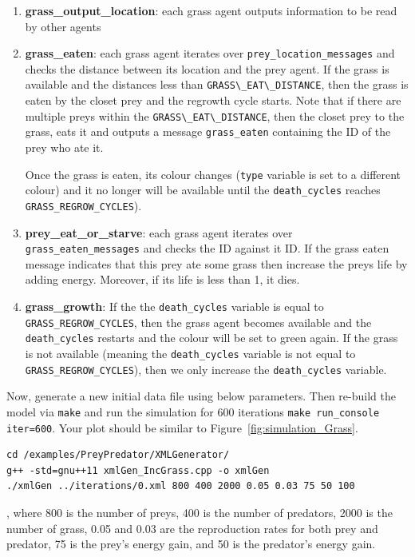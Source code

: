 \begin{enumerate}[{3.1}]
\item \textbf{grass\_output\_location}: each grass agent outputs information to be read by other agents
\item \textbf{grass\_eaten}: each grass agent iterates over \verb|prey_location_messages| and checks the distance between its location and the prey agent. If the grass is available and the distances less than \verb|GRASS\_EAT\_DISTANCE|, then the grass is eaten by the closet prey and the regrowth cycle starts. Note that if there are multiple preys within the \verb|GRASS\_EAT\_DISTANCE|, then the closet prey to the grass, eats it and outputs a message \verb|grass_eaten| containing the ID of the prey who ate it.

Once the grass is eaten, its colour changes (\verb|type| variable is set to a different colour) and it no longer will be available until the \verb|death_cycles| reaches \verb|GRASS_REGROW_CYCLES|). 
\item \textbf{prey\_eat\_or\_starve}: each grass agent iterates over \verb|grass_eaten_messages| and checks the ID against it ID. If the grass eaten message indicates that this prey ate some grass then increase the preys life by adding energy. Moreover, if its life is less than 1, it dies.
\item \textbf{grass\_growth}: If the the \verb|death_cycles| variable is equal to \verb|GRASS_REGROW_CYCLES|, then the grass agent becomes available and the \verb|death_cycles| restarts and the colour will be set to green again. If the grass is not available (meaning the \verb|death_cycles| variable is not equal to \verb|GRASS_REGROW_CYCLES|), then we only increase the \verb|death_cycles| variable.
\end{enumerate}


Now, generate a new initial data file using below parameters. Then re-build the model via \verb|make| and run the simulation for 600 iterations \verb|make run_console iter=600|. Your plot should be similar to Figure~\ref{fig:simulation_Grass}.

\begin{verbatim}
cd /examples/PreyPredator/XMLGenerator/
g++ -std=gnu++11 xmlGen_IncGrass.cpp -o xmlGen
./xmlGen ../iterations/0.xml 800 400 2000 0.05 0.03 75 50 100
\end{verbatim}

, where 800 is the number of preys, 400 is the number of predators, 2000 is the number of grass, 0.05 and 0.03 are the reproduction rates for both prey and predator, 75 is the prey's energy gain, and 50 is the predator's energy gain. 


